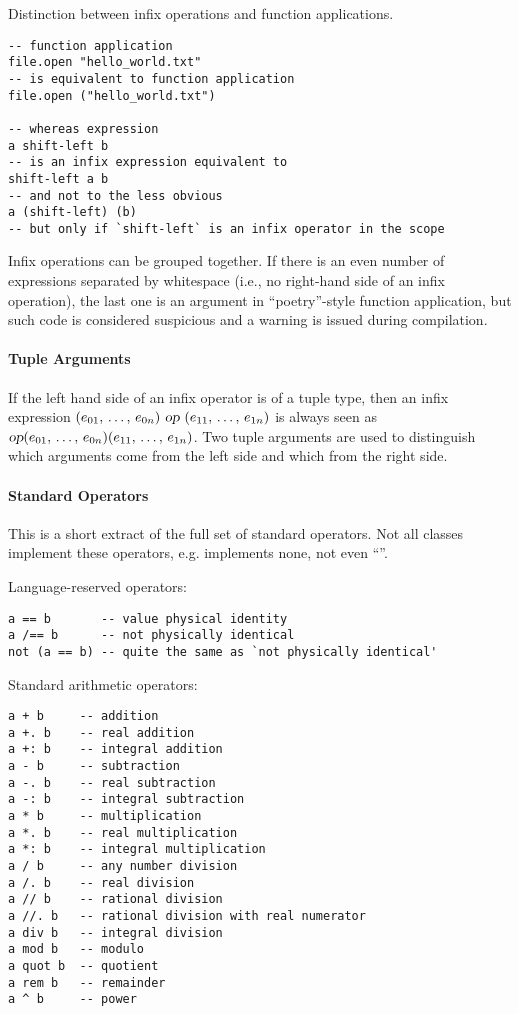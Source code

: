 \example Distinction between infix operations and function applications. 
\begin{lstlisting}[deletekeywords={open}]
-- function application
file.open "hello_world.txt"
-- is equivalent to function application
file.open ("hello_world.txt")

-- whereas expression
a shift-left b
-- is an infix expression equivalent to
shift-left a b
-- and not to the less obvious
a (shift-left) (b)
-- but only if `shift-left` is an infix operator in the scope
\end{lstlisting}

Infix operations can be grouped together. If there is an even number of expressions separated by whitespace (i.e., no right-hand side of an infix operation), the last one is an argument in ``poetry''-style function application, but such code is considered suspicious and a warning is issued during compilation. 





\paragraph{Tuple Arguments}

If the left hand side of an infix operator is of a tuple type, then an infix expression $(e_{01} ,\, \ldots ,\, e_{0n})\ \mbox{\sl op}\ (e_{11} ,\, \ldots ,\, e_{1n})$ is always seen as $\mbox{\sl op}(e_{01} ,\, \ldots ,\, e_{0n})(e_{11} ,\, \ldots ,\, e_{1n})$. Two tuple arguments are used to distinguish which arguments come from the left side and which from the right side. 





\paragraph{Standard Operators}

This is a short extract of the full set of standard operators. Not all classes implement these operators, e.g.  implements none, not even ``\code{=}''. 

Language-reserved operators:
\begin{lstlisting}
a == b       -- value physical identity
a /== b      -- not physically identical
not (a == b) -- quite the same as `not physically identical'
\end{lstlisting}

Standard arithmetic operators:
\begin{lstlisting}
a + b     -- addition
a +. b    -- real addition
a +: b    -- integral addition
a - b     -- subtraction
a -. b    -- real subtraction
a -: b    -- integral subtraction
a * b     -- multiplication
a *. b    -- real multiplication
a *: b    -- integral multiplication
a / b     -- any number division
a /. b    -- real division
a // b    -- rational division
a //. b   -- rational division with real numerator
a div b   -- integral division
a mod b   -- modulo
a quot b  -- quotient
a rem b   -- remainder
a ^ b     -- power
\end{lstlisting}

